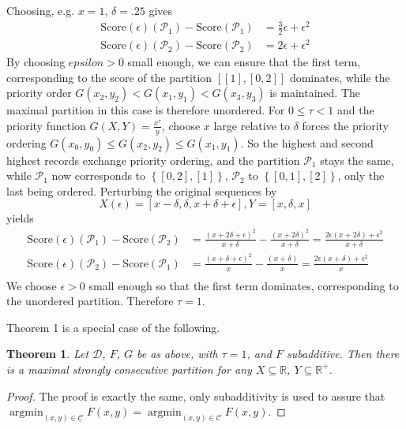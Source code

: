 \documentclass{article}
\newtheorem{thm}{Theorem}
\theoremstyle{case}
\DeclareMathOperator*{\argmin}{argmin} %
\begin{document}
Choosing, e.g. $x = 1$, $\delta = .25$ gives 
\begin{align*}
\text{Score}\left(\epsilon \right)\left(\mathcal{P}_1 \right) - \text{Score}\left(\mathcal{P}_1 \right) &= \frac{3}{2}\epsilon + \epsilon^2 \\
\text{Score}\left(\epsilon \right)\left(\mathcal{P}_2 \right) - \text{Score}\left(\mathcal{P}_2 \right) &= 2\epsilon + \epsilon^2
\end{align*}
By choosing $epsilon > 0$ small enough, we can ensure that the first term, corresponding to the score of the partition $\left[ \left[ 1\right], \left[ 0, 2\right]\right]$ dominates, while the priority order $G(x_2, y_2) < G(x_1, y_1) < G(x_3, y_3)$ is maintained. The maximal partition in this case is therefore unordered.
For $ 0 \leq \tau < 1$ and the priority function $G(X,Y) = \frac{x^{\tau}}{y}$, choose $x$ large relative to $\delta$ forces the priority ordering $G(x_0, y_0) \leq G(x_2, y_2) \leq G(x_1, y_1)$. So the  highest and second highest records exchange priority ordering, and the partition $\mathcal{P}_1$ stays the same, while $\mathcal{P}_1$ now corresponds to $\left\lbrace \left[ 0, 2\right], \left[ 1\right]\right\rbrace$, $\mathcal{P}_2$ to $\left\lbrace \left[ 0, 1\right], \left[ 2\right]\right\rbrace$, only the last being ordered. Perturbing the original sequences by
\[
X\left(\epsilon\right) = \left[ x-\delta, \delta, x + \delta + \epsilon\right], Y = \left[ x, \delta, x\right]
\]
yields
\begin{align*}
\text{Score}\left(\epsilon \right)\left(\mathcal{P}_1 \right) - \text{Score}\left(\mathcal{P}_2 \right) &= \frac{\left( x + 2\delta + \epsilon\right)^2}{x + \delta}  - \frac{\left( x + 2\delta\right)^2}{x + \delta} = \frac{2\epsilon\left( x + 2\delta\right) + \epsilon^2}{x + \delta} \\
\text{Score}\left(\epsilon \right)\left(\mathcal{P}_2 \right) - \text{Score}\left(\mathcal{P}_1 \right) &= \frac{\left( x + \delta + \epsilon\right)^2}{x} - \frac{\left( x + \delta\right)}{x} = \frac{2\epsilon\left( x + \delta \right) + \epsilon^2}{x} \\
\end{align*}
We choose $\epsilon > 0$ small enough so that the first term dominates, corresponding to the unordered partition. Therefore $\tau = 1$.


Theorem 1 is a special case of the following.

\begin{thm} \label{thm1}
Let $\mathcal{D}$, $F$, $G$ be as above, with $\tau = 1$, and $F$ subadditive. Then there is a maximal strongly consecutive partition for any $X \subseteq \mathbb{R}$, $Y \subseteq \mathbb{R}^+$. 
\end{thm}
\begin{proof}
The proof is exactly the same, only subadditivity is used to assure that $\argmin_{(x,y) \in \underline{\mathcal{C}}} F\left( x,y\right) = \argmin_{(x,y) \in \mathcal{C}} F\left( x,y\right)$.
\end{proof}
\end{document}
